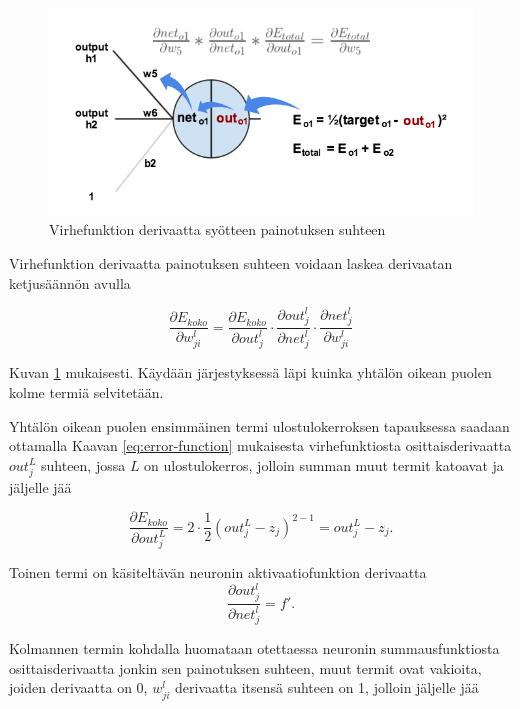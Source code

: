 \documentclass[finnish]{tktltiki2}
\theoremstyle{definition}
\theoremstyle{remark}
\begin{document}


    \begin{figure}[h]
      \centering
      \includegraphics[scale=0.5]{chain-rule}
      \caption{Virhefunktion derivaatta syötteen painotuksen suhteen \cite{backprop-example}}
      \label{pic:chain-rule}
    \end{figure}

    Virhefunktion derivaatta painotuksen suhteen voidaan laskea derivaatan ketjusäännön avulla

    $$ \frac{\partial E_{koko}}{\partial w_{ji}^l} = \frac{\partial E_{koko}}{\partial out_j^{l}} \cdot \frac{\partial out_j^{l}}{\partial net_j^{l}} \cdot \frac{\partial net_j^{l}}{\partial w_{ji}^l}$$

    \noindent Kuvan \ref{pic:chain-rule} mukaisesti. Käydään järjestyksessä läpi kuinka yhtälön oikean puolen kolme termiä selvitetään. 
    
    Yhtälön oikean puolen ensimmäinen termi ulostulokerroksen tapauksessa saadaan ottamalla Kaavan \ref{eq:error-function} mukaisesta virhefunktiosta osittaisderivaatta $out_j^{L}$ suhteen, jossa $L$ on ulostulokerros, jolloin summan muut termit katoavat ja jäljelle jää 

    $$\frac{\partial E_{koko}}{\partial out_j^{L}} = 2 \cdot \frac{1}{2} (out_{j}^{L} - z_j)^{2-1} = out_{j}^{L} - z_j.$$
    
    \noindent Toinen termi on käsiteltävän neuronin aktivaatiofunktion derivaatta
    $$\frac{\partial out_j^{l}}{\partial net_j^{l}} = f'.$$

    \noindent Kolmannen termin kohdalla huomataan otettaessa neuronin summausfunktiosta osittaisderivaatta jonkin sen painotuksen suhteen, muut termit ovat vakioita, joiden derivaatta on 0, $w_{ji}^l$ derivaatta itsensä suhteen on 1, jolloin jäljelle jää
\end{document}
